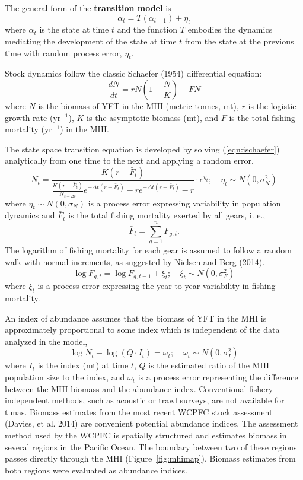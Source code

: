 \documentclass[12pt,letterpaper]{article}
\newcommand\peryr{yr$^{-1}$}
\begin{document}
The general form of the {\bf transition model} is
\begin{equation}
\alpha_t=T(\alpha_{t-1}) + \eta_t
\end{equation}
where $\alpha_t$ is the state at time $t$ and 
the function $T$ embodies the dynamics mediating the
development of the state at time $t$ from the state at the previous
time with random process error, $\eta_t$.

Stock dynamics follow the classic Schaefer (1954) differential equation:
\begin{equation}
\label{eqn:ischaefer}
\frac{dN}{dt} = rN(1-\frac{N}{K}) - FN
\end{equation}
where $N$ is the biomass of YFT in the MHI (metric tonnes, mt), 
$r$ is the logistic growth rate (\peryr),
$K$ is the asymptotic biomass (mt), and
$F$ is the total fishing mortality (\peryr) in the MHI.

The state space transition equation is developed by solving
(\ref{eqn:ischaefer}) analytically from one time to the next and
applying a random error.
\begin{equation}
\label{eqn:intschaeferA}
N_t = \frac{K(r-\bar{F}_t)}{\frac{K(r-\bar{F}_t)}{N_{t-\Delta t}}e^{-\Delta
t(r-\bar{F}_t)}-re^{-\Delta t(r-\bar{F}_t)} -r} \cdot e^{\eta_t};
\quad \eta_t\sim N(0,\sigma^2_N)
\end{equation}
where $\eta_t \sim N(0,\sigma_N)$ is a process error expressing
variability in population dynamics
and $\bar{F}_t$ is the total fishing mortality exerted by all gears, i. e.,
\begin{equation}
\bar{F}_t =\sum_{g=1}^n F_{g,t}.
\end{equation}
The logarithm of fishing mortality for each gear is assumed to
follow a random walk with normal increments, as suggested by Nielsen
and Berg (2014).
\begin{equation}
\label{eqn:Fwalk}
\log F_{g,t} = \log F_{g,t-1} + \xi_t;\quad \xi_t\sim
N(0,\sigma^2_F)
\end{equation}
where  $\xi_t$ is a process error expressing the year to year
variability in fishing mortality.

An index of abundance assumes that the biomass of YFT in the MHI
is approximately proportional to some index which is independent of
the data analyzed in the model,
\begin{equation}
\log N_t - \log (Q\cdot I_t) = \omega_t;\quad \omega_t\sim N(0,\sigma^2_I)
\label{eqn:index}
\end{equation}
where
$I_t$ is the index (mt) at time $t$,
$Q$ is the estimated ratio of the MHI population size to the index,
and $\omega_t$ is a process error representing the difference
between the MHI biomass and the abundance index. 
Conventional fishery independent methods, such as acoustic or trawl
surveys, are not available for tunas. 
Biomass estimates from the most recent WCPFC stock
assessment (Davies, et al. 2014) are convenient potential abundance
indices. The assessment method used by the
WCPFC is spatially structured and estimates biomass in several regions
in the Pacific Ocean. The boundary between two of these
regions passes directly through the MHI (Figure~\ref{fig:mhimap}).
Biomass estimates from both regions were evaluated as abundance indices.
\end{document}
